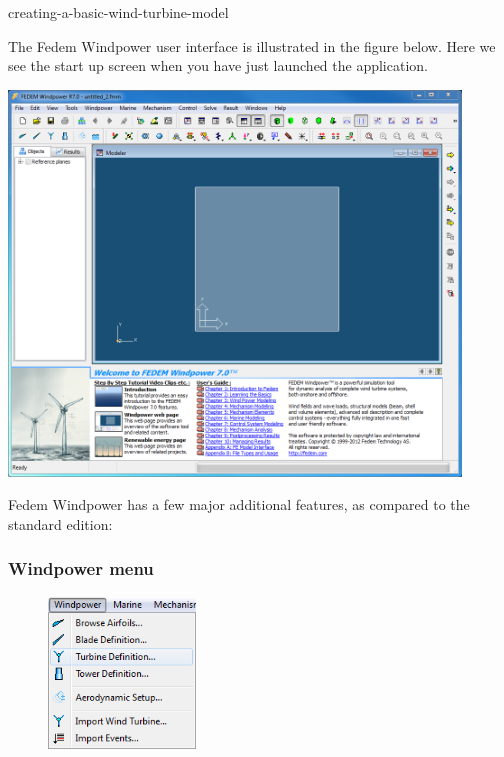 \clearpage

%

        {creating-a-basic-wind-turbine-model}

The Fedem Windpower user interface is illustrated in the figure below.
Here we see the start up screen when you have just launched the application.

\includegraphics[width=0.9\textwidth]{Figures/3b-Main1}

Fedem Windpower has a few major additional features,
as compared to the standard edition:

\subsubsection{Windpower menu}

\begin{figure}
  \baselineskip
  \includegraphics[width=0.35\textwidth]{Figures/3b-WindpowerMenu}
\end{figure}

